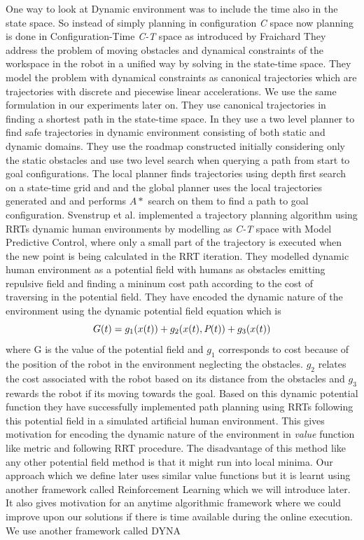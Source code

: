 \documentclass[MTech]{iitmdiss}
\begin{document}
One way to look at Dynamic environment was to include the time also in the state space. So instead of simply planning in configuration \emph{C} space now planning is done in Configuration-Time \emph{C-T} space as introduced by Fraichard
\cite{fraichard99} 
 They address the problem of moving obstacles and dynamical constraints of the workspace in the robot in a unified way by solving in the state-time space. They model the problem with dynamical constraints as canonical trajectories which are trajectories with discrete and piecewise linear accelerations. We use the same formulation in our experiments later on. They use canonical trajectories in finding a shortest path in the state-time space.  In 
\cite{jm05} 
  they use a two level planner to find safe trajectories in dynamic environment consisting of both static and dynamic domains. They use the roadmap constructed initially considering only the static obstacles and use two level search when querying a path from start to goal configurations. The local planner finds trajectories using depth first search on a state-time grid and and the global planner uses the local trajectories generated and and performs $A*$ \cite{hnb68} search on them to find a path to goal configuration.
Svenstrup et al. \cite{svestrup10}
implemented a trajectory planning algorithm using RRTs dynamic human environments by modelling as \emph{C-T} space with Model Predictive Control, where only a small part of the trajectory is executed when the new point is being calculated in the RRT iteration. They modelled dynamic human environment as a potential field with humans as obstacles emitting repulsive field and finding a mininum cost path according to the cost of traversing in the potential field. They have encoded the dynamic nature of the environment using the dynamic potential field equation which is 
$$G(t) = g_1(x(t)) + g_2(x(t), \emph{P}(t) )+ g_3(x(t)) $$
where G is the value of the potential field and $g_1$ corresponds to cost because of the position of the robot in the environment neglecting the obstacles. $g_2$ relates the cost associated with the robot based on its distance from the obstacles and $g_3$ rewards the robot if its moving towards the goal. Based on this dynamic potential function they have successfully implemented path planning using RRTs following this potential field in a simulated artificial human environment. This gives motivation for encoding the dynamic nature of the environment in \textit{value} function like metric and following RRT procedure. The disadvantage of this method like any other potential field method is that it might run into local minima. Our approach which we define later uses similar value functions but it is learnt using another framework called Reinforcement Learning which we will introduce later. It also gives motivation for an anytime algorithmic framework where we could improve upon our solutions if there is time available during the online execution. We use another framework called DYNA 
\end{document}
